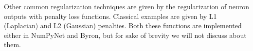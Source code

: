 \documentclass{standalone}
\begin{document}
Other common regularization techniques are given by the regularization of neuron outputs with penalty loss functions.
Classical examples are given by L1 (Laplacian) and L2 (Gaussian) penalties.
Both these functions are implemented either in \textsf{NumPyNet} and \textsf{Byron}, but for sake of brevity we will not discuss about them.
\end{document}
